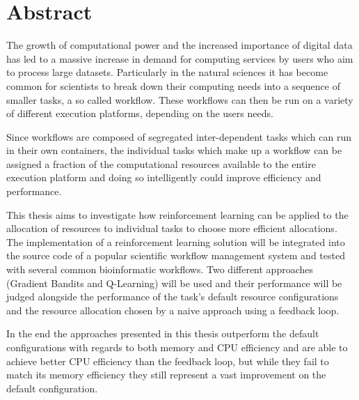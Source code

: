 
\cleardoublepage
{}
\section*{Abstract}

The growth of computational power and the increased importance of digital data has led to a massive increase in demand for computing services by users who aim to process large datasets. Particularly in the natural sciences it has become common for scientists to break down their computing needs into a sequence of smaller tasks, a so called workflow. These workflows can then be run on a variety of different execution platforms, depending on the users needs.

Since workflows are composed of segregated inter-dependent tasks which can run in their own containers, the individual tasks which make up a workflow can be assigned a fraction of the computational resources available to the entire execution platform and doing so intelligently could improve efficiency and performance.

This thesis aims to investigate how reinforcement learning can be applied to the allocation of resources to individual tasks to choose more efficient allocations. The implementation of a reinforcement learning solution will be integrated into the source code of a popular scientific workflow management system and tested with several common bioinformatic workflows. Two different approaches (Gradient Bandits and Q-Learning) will be used and their performance will be judged alongside the performance of the task's default resource configurations and the resource allocation chosen by a naive approach using a feedback loop.

In the end the approaches presented in this thesis outperform the default configurations with regards to both memory and CPU efficiency and are able to achieve better CPU efficiency than the feedback loop, but while they fail to match its memory efficiency they still represent a vast improvement on the default configuration.



